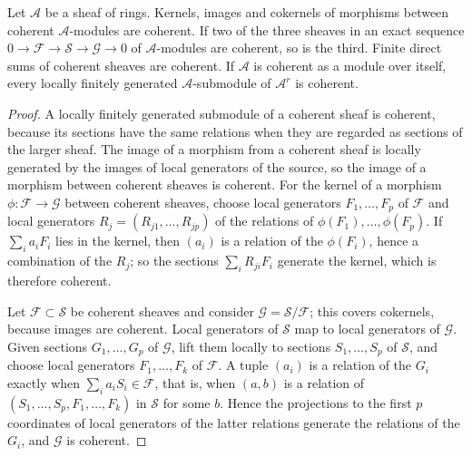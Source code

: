 \begin{lemma}\label{lem:coherent-sheaf-algebra}
Let $\mathcal A$ be a sheaf of rings. Kernels, images and cokernels of morphisms between coherent $\mathcal A$-modules are coherent. If two of the three sheaves in an exact sequence $0\to\mathcal F\to\mathcal S\to\mathcal G\to0$ of $\mathcal A$-modules are coherent, so is the third. Finite direct sums of coherent sheaves are coherent. If $\mathcal A$ is coherent as a module over itself, every locally finitely generated $\mathcal A$-submodule of $\mathcal A^r$ is coherent.
\end{lemma}
\begin{proof}
A locally finitely generated submodule of a coherent sheaf is coherent, because its sections have the same relations when they are regarded as sections of the larger sheaf. The image of a morphism from a coherent sheaf is locally generated by the images of local generators of the source, so the image of a morphism between coherent sheaves is coherent. For the kernel of a morphism $\phi\colon\mathcal F\to\mathcal G$ between coherent sheaves, choose local generators $F_1,\ldots,F_p$ of $\mathcal F$ and local generators $R_j=(R_{j1},\ldots,R_{jp})$ of the relations of $\phi(F_1),\ldots,\phi(F_p)$. If $\sum_ia_iF_i$ lies in the kernel, then $(a_i)$ is a relation of the $\phi(F_i)$, hence a combination of the $R_j$; so the sections $\sum_iR_{ji}F_i$ generate the kernel, which is therefore coherent.

Let $\mathcal F\subset\mathcal S$ be coherent sheaves and consider $\mathcal G=\mathcal S/\mathcal F$; this covers cokernels, because images are coherent. Local generators of $\mathcal S$ map to local generators of $\mathcal G$. Given sections $G_1,\ldots,G_p$ of $\mathcal G$, lift them locally to sections $S_1,\ldots,S_p$ of $\mathcal S$, and choose local generators $F_1,\ldots,F_k$ of $\mathcal F$. A tuple $(a_i)$ is a relation of the $G_i$ exactly when $\sum_ia_iS_i\in\mathcal F$, that is, when $(a,b)$ is a relation of $(S_1,\ldots,S_p,F_1,\ldots,F_k)$ in $\mathcal S$ for some $b$. Hence the projections to the first $p$ coordinates of local generators of the latter relations generate the relations of the $G_i$, and $\mathcal G$ is coherent.


\end{proof}
